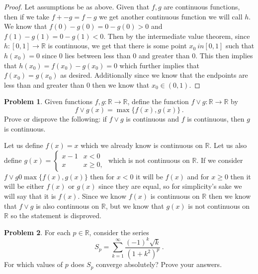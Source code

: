 \documentclass[11pt]{article}
\theoremstyle{definition}
\newtheorem{problem}{Problem}
\newcommand{\R}{\mathbb{R}}
\begin{document}
\begin{proof}
Let assumptions be as above. Given that $f, g$ are continuous functions, then if we take $f + -g = f - g$ we get another continuous function we will call $h$. We know that $f(0) - g(0) = 0 - g(0) > 0$ and $f(1) - g(1) = 0 - g(1) < 0.$ Then by the intermediate value theorem, since $h: [0, 1] \rightarrow \R$ is continuous, we get that there is some point $x_0 \ in [0, 1]$ such that $h(x_0) = 0$ since $0$ lies between less than $0$ and greater than $0$. This then implies that $h(x_0) = f(x_0) - g(x_0) = 0$ which further implies that $f(x_0) = g(x_0)$ as desired. Additionally since we know that the endpoints are less than and greater than $0$ then we know that $x_0 \in (0, 1)$.
\end{proof}

\pagebreak
\begin{problem}
Given functions $f, g : \R \to \R$, define the function $f \vee g : \R \to \R$ by
\[
f \vee g (x) = \max\{ f(x) , g(x)\} \,. 
\]
Prove or disprove the following: if $f \vee g$ is continuous and $f$ is continuous, then $g$ is continuous. 
\end{problem}

Let us define $f(x) = x$ which we already know is continuous on $\R$. Let us also define $g(x) = \begin{cases}
x - 1 & x < 0\\
x & x \geq 0,
\end{cases}$ which is not continuous on $\R.$ If we consider $f\vee g 0 \max\{f(x), g(x)\}$ then for $x < 0$ it will be $f(x)$ and for $x\geq 0$ then it will be either $f(x)$ or $g(x)$ since they are equal, so for simplicity's sake we will say that it is $f(x).$ Since we know $f(x)$ is continuous on $\R$ then we know that $f\vee g$ is also continuous on $\R$, but we know that $g(x)$ is not continuous on $\R$ so the statement is disproved.

\pagebreak
\begin{problem}
For each $p \in \R$, consider the series
\[
S_p = \sum_{k = 1}^\infty \frac{(-1)^k \sqrt{k} }{(1 + k^2)^{p}} \, .
\]
For which values of $p$ does $S_p$ converge absolutely? Prove your answers. 
\end{problem}
\end{document}
